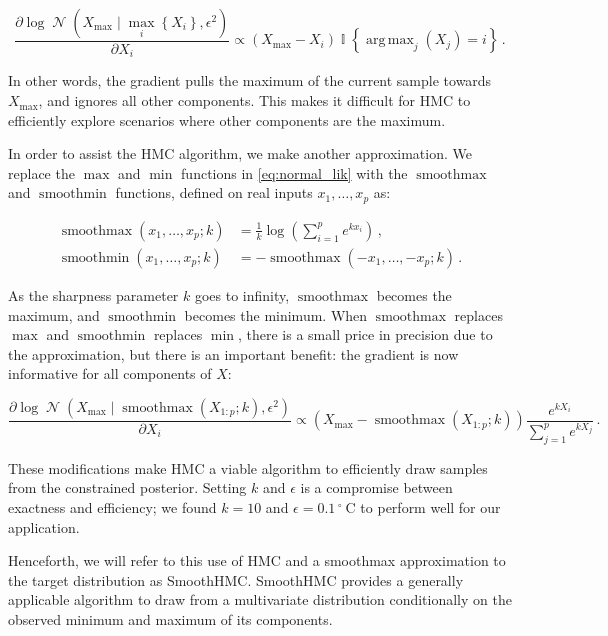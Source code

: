 \documentclass[letter]{article}
\newcommand{\genericdel}[3]{%
      \left#1#3\right#2
    }
\newcommand{\del}[1]{\genericdel(){#1}}
\newcommand{\cbr}[1]{\genericdel\{\}{#1}}
\DeclareMathOperator*{\argmax}{arg\,max}
\DeclareMathOperator{\Ind}{\mathbb{I}}
\DeclareMathOperator{\normal}{\mathcal{N}}
\newcommand{\degreeC}{{}^{\circ}~\mathrm{C}}
\DeclareMathOperator*{\softmax}{smoothmax}
\DeclareMathOperator*{\softmin}{smoothmin}
\newcommand{\Xmax}{X_{\max}}
\newcommand{\eqlabel}[1]{\label{#1}}
\begin{document}
\begin{equation}
\frac{\partial \log \normal\del{\Xmax \mid \max_i\cbr{X_i}, \epsilon^2}}{\partial X_i} \propto \del{\Xmax - X_i} \Ind\cbr{\argmax_j\del{X_j} = i} \,.
\end{equation}

In other words, the gradient pulls the maximum of the current sample towards \(\Xmax\),
and ignores all other components.
This makes it difficult for HMC to efficiently explore scenarios where other components are the maximum.
    


        In order to assist the HMC algorithm, we make another approximation.
We replace the \(\max\) and \(\min\) functions in \eqref{eq:normal_lik} with the \(\softmax\) and \(\softmin\) functions, defined on real inputs \(x_1, \ldots, x_p\) as:

\begin{equation}
\begin{split}
    \softmax\del{x_1, \ldots, x_p ; k} &= \frac{1}{k} \log\del{\sum_{i=1}^p e^{kx_i}}\,, \\
    \softmin\del{x_1, \ldots, x_p ; k} &= -\softmax\del{-x_1, \ldots, -x_p; k}\,.
\end{split}
\eqlabel{eq:softmax}
\end{equation}

As the sharpness parameter \(k\) goes to infinity, \(\softmax\) becomes the maximum, and \(\softmin\) becomes the minimum.
When \(\softmax\) replaces \(\max\) and \(\softmin\) replaces \(\min\), there is a small price in precision due to the approximation, but there is an important benefit: the gradient is now informative for all components of \(X\):

\begin{equation}
\frac{\partial \log \normal\del{\Xmax \mid \softmax\del{X_{1:p} ; k}, \epsilon^2}}{\partial X_i} \propto \del{\Xmax - \softmax\del{X_{1:p} ; k}} 
        \frac{e^{k X_i}}
             {\sum_{j=1}^p e^{k X_j}} \,.
\end{equation}

These modifications make HMC a viable algorithm to efficiently draw samples from the constrained posterior.
Setting \(k\) and \(\epsilon\) is a compromise between exactness and efficiency;
we found \(k=10\) and \(\epsilon=0.1\,\degreeC\) to perform well for our application.

Henceforth, we will refer to this use of HMC and a smoothmax approximation to the target distribution as SmoothHMC.
SmoothHMC provides a generally applicable algorithm to draw from a multivariate distribution conditionally on the observed minimum and maximum of its components.
    
\end{document}

